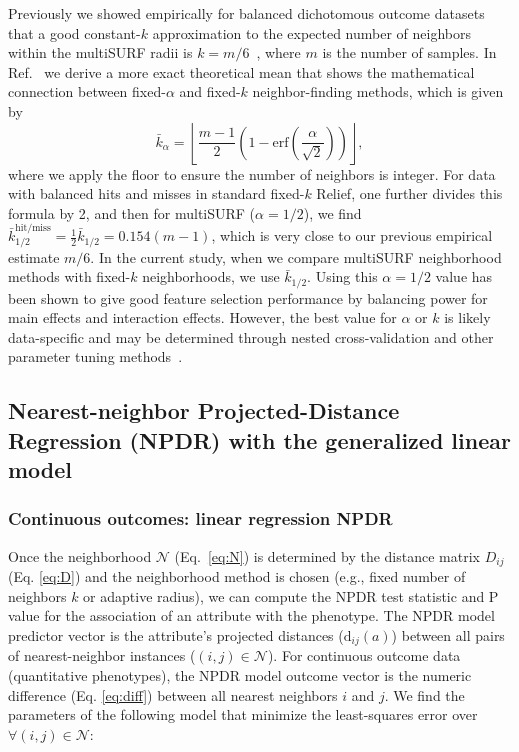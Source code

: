 \documentclass{bioinfo}
\begin{document}
Previously we showed empirically for balanced dichotomous outcome datasets that a good constant-$k$ approximation to the expected number of neighbors within the multiSURF radii is $k=m/6$~\cite{stir}, where $m$ is the number of samples.
In Ref.~\cite{bod} we derive a more exact theoretical mean that shows the mathematical connection between fixed-$\alpha$ and fixed-$k$ neighbor-finding methods, which is given by 
\begin{equation}\label{eq:kbar}
{\bar{k}}_{\alpha} = \left \lfloor \frac{m-1}{2}  \left( 1 - \mathrm{erf}\left( \frac{\alpha}{\sqrt{2}} \right) \right) \right \rfloor,
\end{equation}
where we apply the floor to ensure the number of neighbors is integer.
For data with balanced hits and misses in standard fixed-$k$ Relief, one further divides this formula by 2, and then for multiSURF ($\alpha=1/2$), we find $\bar{k}_{1/2}^{\text{hit/miss}} = \frac{1}{2}\bar{k}_{1/2} = 0.154 (m-1)$, which is very close to our previous empirical estimate $m/6$.
In the current study, when we compare multiSURF neighborhood methods with fixed-$k$ neighborhoods, we use $\bar{k}_{1/2}$.
Using this $\alpha=1/2$ value has been shown to give good feature selection performance by balancing power for main effects and interaction effects.
However, the best value for $\alpha$ or $k$ is likely data-specific and may be determined through nested cross-validation and other parameter tuning methods~\cite{bod}.

\subsection{Nearest-neighbor Projected-Distance Regression (NPDR) with the generalized linear model}

\subsubsection{Continuous outcomes: linear regression NPDR}\label{sec:regress}

Once the neighborhood $\mathcal{N}$ (Eq.~\ref{eq:N}) is determined by the distance matrix $D_{ij}$ (Eq. \ref{eq:D}) and the neighborhood method is chosen (e.g., fixed number of neighbors $k$ or adaptive radius), we can compute the NPDR test statistic and P value for the association of an attribute with the phenotype.
The NPDR model predictor vector is the attribute's projected distances ($\text{d}_{ij}(a)$) between all pairs of nearest-neighbor instances ($(i,j) \in \mathcal{N}$).
For continuous outcome data (quantitative phenotypes), the NPDR model outcome vector is the numeric difference (Eq. \ref{eq:diff}) between all nearest neighbors $i$ and $j$.
We find the parameters of the following model that minimize the least-squares error over $\forall(i,j) \in \mathcal{N}$: 
\end{document}
